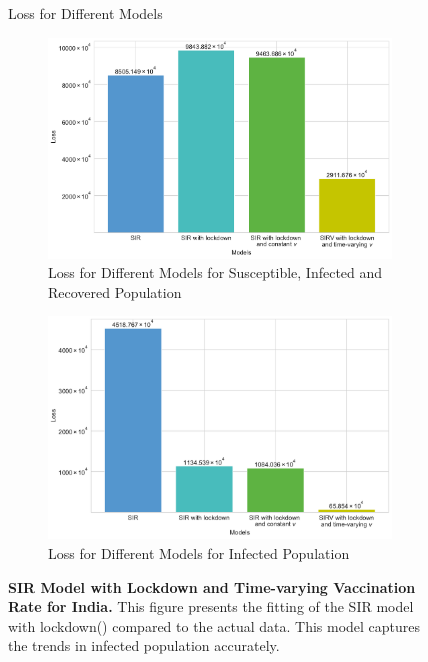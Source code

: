 \documentclass[tikz,fleqn,12pt]{wlscirep}
\begin{document}
\begin{figure}[htbp!]
	\caption{Loss for Different Models}
	\begin{subfigure}[t]{0.48\textwidth}
		\centering
		\includegraphics[width=\linewidth]{images/comparing_costs_SIR_IND.pdf}
		\caption{Loss for Different Models for Susceptible, Infected and Recovered Population}
		\label{fig:comparing_costs_SIR_IND}
	\end{subfigure}
	\hfill
	\begin{subfigure}[t]{0.48\textwidth}
		\centering
		\includegraphics[width=\linewidth]{images/comparing_costs_I_IND.pdf}
		\caption{Loss for Different Models for Infected Population}
		\label{fig:comparing_costs_I_IND}
	\end{subfigure}
  \caption{\textbf{SIR Model with Lockdown and Time-varying Vaccination Rate for India.}  This figure presents the fitting of the SIR model with lockdown() compared to the actual data. This model captures the trends in infected population accurately.}
\end{figure}
\end{document}
